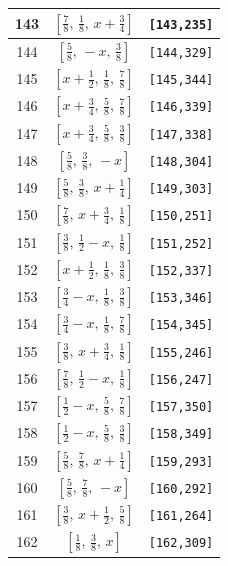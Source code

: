 \documentclass[fleqn,8pt]{jsarticle}
\begin{document}
\begin{longtable}{ccc}
143 & $\left[ \frac{7}{8},\, \frac{1}{8},\, x + \frac{3}{4} \right]$ & {\tt [143,235]} \\ \hline
144 & $\left[ \frac{5}{8},\, - x,\, \frac{3}{8} \right]$ & {\tt [144,329]} \\ \hline
145 & $\left[ x + \frac{1}{2},\, \frac{1}{8},\, \frac{7}{8} \right]$ & {\tt [145,344]} \\ \hline
146 & $\left[ x + \frac{3}{4},\, \frac{5}{8},\, \frac{7}{8} \right]$ & {\tt [146,339]} \\ \hline
147 & $\left[ x + \frac{3}{4},\, \frac{5}{8},\, \frac{3}{8} \right]$ & {\tt [147,338]} \\ \hline
148 & $\left[ \frac{5}{8},\, \frac{3}{8},\, - x \right]$ & {\tt [148,304]} \\ \hline
149 & $\left[ \frac{5}{8},\, \frac{3}{8},\, x + \frac{1}{4} \right]$ & {\tt [149,303]} \\ \hline
150 & $\left[ \frac{7}{8},\, x + \frac{3}{4},\, \frac{1}{8} \right]$ & {\tt [150,251]} \\ \hline
151 & $\left[ \frac{3}{8},\, \frac{1}{2} - x,\, \frac{1}{8} \right]$ & {\tt [151,252]} \\ \hline
152 & $\left[ x + \frac{1}{2},\, \frac{1}{8},\, \frac{3}{8} \right]$ & {\tt [152,337]} \\ \hline
153 & $\left[ \frac{3}{4} - x,\, \frac{1}{8},\, \frac{3}{8} \right]$ & {\tt [153,346]} \\ \hline
154 & $\left[ \frac{3}{4} - x,\, \frac{1}{8},\, \frac{7}{8} \right]$ & {\tt [154,345]} \\ \hline
155 & $\left[ \frac{3}{8},\, x + \frac{3}{4},\, \frac{1}{8} \right]$ & {\tt [155,246]} \\ \hline
156 & $\left[ \frac{7}{8},\, \frac{1}{2} - x,\, \frac{1}{8} \right]$ & {\tt [156,247]} \\ \hline
157 & $\left[ \frac{1}{2} - x,\, \frac{5}{8},\, \frac{7}{8} \right]$ & {\tt [157,350]} \\ \hline
158 & $\left[ \frac{1}{2} - x,\, \frac{5}{8},\, \frac{3}{8} \right]$ & {\tt [158,349]} \\ \hline
159 & $\left[ \frac{5}{8},\, \frac{7}{8},\, x + \frac{1}{4} \right]$ & {\tt [159,293]} \\ \hline
160 & $\left[ \frac{5}{8},\, \frac{7}{8},\, - x \right]$ & {\tt [160,292]} \\ \hline
161 & $\left[ \frac{3}{8},\, x + \frac{1}{2},\, \frac{5}{8} \right]$ & {\tt [161,264]} \\ \hline
162 & $\left[ \frac{1}{8},\, \frac{3}{8},\, x \right]$ & {\tt [162,309]} \\ \hline

\end{longtable}
\end{document}
